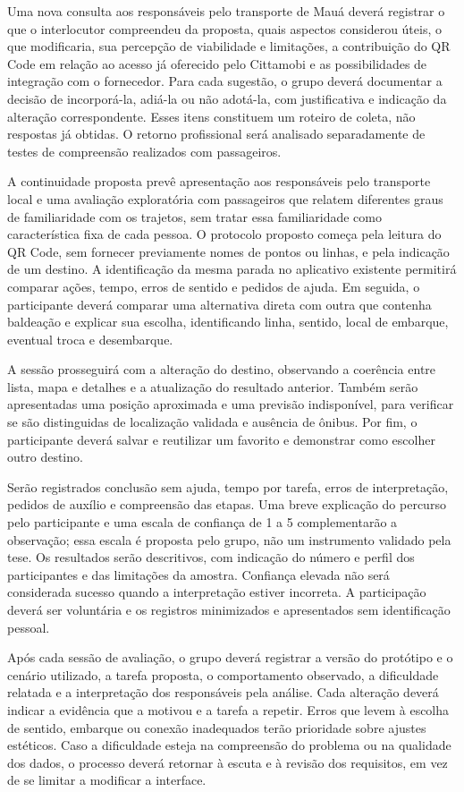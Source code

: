 Uma nova consulta aos responsáveis pelo transporte de Mauá deverá registrar o que o interlocutor compreendeu da proposta, quais aspectos considerou úteis, o que modificaria, sua percepção de viabilidade e limitações, a contribuição do QR Code em relação ao acesso já oferecido pelo Cittamobi e as possibilidades de integração com o fornecedor. Para cada sugestão, o grupo deverá documentar a decisão de incorporá-la, adiá-la ou não adotá-la, com justificativa e indicação da alteração correspondente. Esses itens constituem um roteiro de coleta, não respostas já obtidas. O retorno profissional será analisado separadamente de testes de compreensão realizados com passageiros.

A continuidade proposta prevê apresentação aos responsáveis pelo transporte local e uma avaliação exploratória com passageiros que relatem diferentes graus de familiaridade com os trajetos, sem tratar essa familiaridade como característica fixa de cada pessoa. O protocolo proposto começa pela leitura do QR Code, sem fornecer previamente nomes de pontos ou linhas, e pela indicação de um destino. A identificação da mesma parada no aplicativo existente permitirá comparar ações, tempo, erros de sentido e pedidos de ajuda. Em seguida, o participante deverá comparar uma alternativa direta com outra que contenha baldeação e explicar sua escolha, identificando linha, sentido, local de embarque, eventual troca e desembarque.

A sessão prosseguirá com a alteração do destino, observando a coerência entre lista, mapa e detalhes e a atualização do resultado anterior. Também serão apresentadas uma posição aproximada e uma previsão indisponível, para verificar se são distinguidas de localização validada e ausência de ônibus. Por fim, o participante deverá salvar e reutilizar um favorito e demonstrar como escolher outro destino.

Serão registrados conclusão sem ajuda, tempo por tarefa, erros de interpretação, pedidos de auxílio e compreensão das etapas. Uma breve explicação do percurso pelo participante e uma escala de confiança de 1 a 5 complementarão a observação; essa escala é proposta pelo grupo, não um instrumento validado pela tese. Os resultados serão descritivos, com indicação do número e perfil dos participantes e das limitações da amostra. Confiança elevada não será considerada sucesso quando a interpretação estiver incorreta. A participação deverá ser voluntária e os registros minimizados e apresentados sem identificação pessoal.

Após cada sessão de avaliação, o grupo deverá registrar a versão do protótipo e o cenário utilizado, a tarefa proposta, o comportamento observado, a dificuldade relatada e a interpretação dos responsáveis pela análise. Cada alteração deverá indicar a evidência que a motivou e a tarefa a repetir. Erros que levem à escolha de sentido, embarque ou conexão inadequados terão prioridade sobre ajustes estéticos. Caso a dificuldade esteja na compreensão do problema ou na qualidade dos dados, o processo deverá retornar à escuta e à revisão dos requisitos, em vez de se limitar a modificar a interface.

